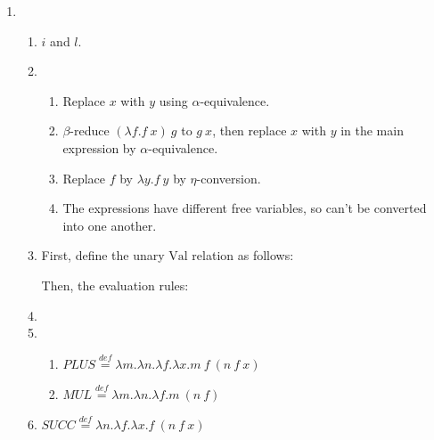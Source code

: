 \documentclass{article}
\newcommand{\defeq}{\overset{\mathit{def}}{=}}
\begin{document}
\begin{enumerate}
\item
  \begin{enumerate}
  \item $i$ and $l$.
  \item
    \begin{enumerate}
    \item Replace $x$ with $y$ using $\alpha$-equivalence.
    \item $\beta$-reduce $(\lambda f.f~x)~g$ to $g~x$, then replace $x$ with $y$ in the main expression by $\alpha$-equivalence.
    \item Replace $f$ by $\lambda y.f~y$ by $\eta$-conversion.
    \item The expressions have different free variables, so can't be converted into one another.
    \end{enumerate}
  \item
    First, define the unary $\mathrm{Val}$ relation as follows:
    Then, the evaluation rules:
  \item
  \item
    \begin{enumerate}
      \item $PLUS \defeq \lambda m.\lambda n.\lambda f.\lambda x.m~f~(n~f~x)$
      \item $MUL \defeq \lambda m.\lambda n.\lambda f.m~(n~f)$
    \end{enumerate}
  \item
    $SUCC \defeq \lambda n.\lambda f.\lambda x.f~(n~f~x)$


\end{enumerate}
\end{enumerate}
\end{document}
